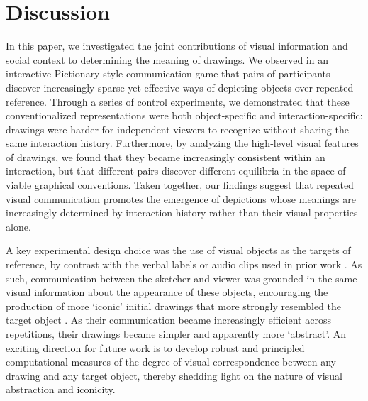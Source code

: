 \section{Discussion}

In this paper, we investigated the joint contributions of visual information and social context to determining the meaning of drawings.
We observed in an interactive Pictionary-style communication game that pairs of participants discover increasingly sparse yet effective ways of depicting objects over repeated reference.
Through a series of control experiments, we demonstrated that these conventionalized representations were both object-specific and interaction-specific: drawings were harder for independent viewers to recognize without sharing the same interaction history.
Furthermore, by analyzing the high-level visual features of drawings, we found that they became increasingly consistent within an interaction, but that different pairs discover different equilibria in the space of viable graphical conventions.
Taken together, our findings suggest that repeated visual communication promotes the emergence of depictions whose meanings are increasingly determined by interaction history rather than their visual properties alone.

A key experimental design choice was the use of visual objects as the targets of reference, by contrast with the verbal labels or audio clips used in prior work \cite{GalantucciGarrod11_ExperimentalSemiotics,FayGarrodRobertsSwoboda10_InteractiveEvolution}. %
As such, communication between the sketcher and viewer was grounded in the same visual information about the appearance of these objects, encouraging the production of more `iconic' initial drawings that more strongly resembled the target object \cite{verhoef2016iconicity,perlman2015iconicity}.
As their communication became increasingly efficient across repetitions, their drawings became simpler and apparently more `abstract'.
An exciting direction for future work is to develop robust and principled computational measures of the degree of visual correspondence between any drawing and any target object, thereby shedding light on the nature of visual abstraction and iconicity.

